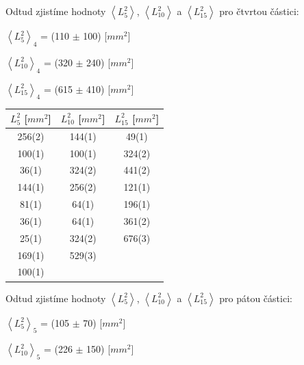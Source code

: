 \documentclass[a4paper,11pt]{article}
\begin{document}
    \hspace{10pt}
    \begin{minipage}{0.5\textwidth} 
        Odtud zjistíme hodnoty $\left\langle L_{5}^2\right\rangle$, $\left\langle L_{10}^2\right\rangle$ a $\left\langle L_{15}^2\right\rangle$ pro čtvrtou částici: 
        \begin{center}
            $\left\langle L_{5}^2\right\rangle_4$ = (110 $\pm$ 100) [$mm^2$]
            \vspace{5pt}
            \par $\left\langle L_{10}^2\right\rangle_4$ = (320 $\pm$ 240) [$mm^2$]
            \vspace{5pt}
            \par $\left\langle L_{15}^2\right\rangle_4$ = (615 $\pm$ 410) [$mm^2$]
        \end{center}
        \vspace{15pt}
        \centering
        \begin{tabular}{|c|c|c|}
            \hline
            $L_5^2$ [$mm^2$] & $L_{10}^2$ [$mm^2$] & $L_{15}^2$ [$mm^2$] \\
            \hline
            256(2) & 144(1) & 49(1) \\
            100(1) & 100(1) & 324(2) \\
            36(1) & 324(2) & 441(2) \\
            144(1) & 256(2) & 121(1) \\
            81(1) & 64(1) & 196(1) \\
            36(1) & 64(1) & 361(2) \\
            25(1) & 324(2) & 676(3) \\
            169(1) & 529(3) &  \\
            100(1) &  &  \\
            \hline
            \end{tabular}
            \captionsetup{justification=centering, font=footnotesize}
        \vspace{15pt}
        \raggedright
        Odtud zjistíme hodnoty $\left\langle L_{5}^2\right\rangle$, $\left\langle L_{10}^2\right\rangle$ a $\left\langle L_{15}^2\right\rangle$ pro pátou částici: 
        \begin{center}
            $\left\langle L_{5}^2\right\rangle_5$ = (105 $\pm$ 70) [$mm^2$]
            \vspace{5pt}
            \par $\left\langle L_{10}^2\right\rangle_5$ = (226 $\pm$ 150) [$mm^2$]

\end{center}
\end{minipage}
\end{document}
